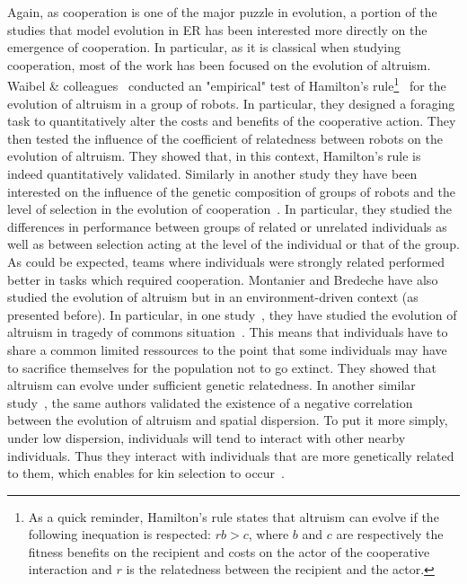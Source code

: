         Again, as cooperation is one of the major puzzle in evolution, a portion of the studies that model evolution in ER has been interested more directly on the emergence of cooperation. In particular, as it is classical when studying cooperation, most of the work has been focused on the evolution of altruism. Waibel \& colleagues~\parencite{Waibel2011} conducted an "empirical" test of Hamilton's rule\footnote{As a quick reminder, Hamilton's rule states that altruism can evolve if the following inequation is respected: $rb > c$, where $b$ and $c$ are respectively the fitness benefits on the recipient and costs on the actor of the cooperative interaction and $r$ is the relatedness between the recipient and the actor.}~\parencite{Hamilton1964} for the evolution of altruism in a group of robots. In particular, they designed a foraging task to quantitatively alter the costs and benefits of the cooperative action. They then tested the influence of the coefficient of relatedness between robots on the evolution of altruism. They showed that, in this context, Hamilton's rule is indeed quantitatively validated. Similarly in another study they have been interested on the influence of the genetic composition of groups of robots and the level of selection in the evolution of cooperation~\parencite{Waibel2009}. In particular, they studied the differences in performance between groups of related or unrelated individuals as well as between selection acting at the level of the individual or that of the group. As could be expected, teams where individuals were strongly related performed better in tasks which required cooperation. Montanier and Bredeche have also studied the evolution of altruism but in an environment-driven context (as presented before). In particular, in one study~\parencite{Montanier2011}, they have studied the evolution of altruism in tragedy of commons situation~\parencite{Hardin1968}. This means that individuals have to share a common limited ressources to the point that some individuals may have to sacrifice themselves for the population not to go extinct. They showed that altruism can evolve under sufficient genetic relatedness. In another similar study~\parencite{Montanier2013}, the same authors validated the existence of a negative correlation between the evolution of altruism and spatial dispersion. To put it more simply, under low dispersion, individuals will tend to interact with other nearby individuals. Thus they interact with individuals that are more genetically related to them, which enables for kin selection to occur~\parencite{VanBaalen1998}. 

